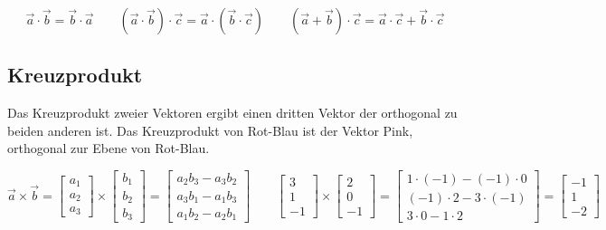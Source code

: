 \begin{equation*}
    \vec{a} \cdot \vec{b} = \vec{b} \cdot \vec{a}
    \qquad (\vec{a} \cdot \vec{b}) \cdot \vec{c} = \vec{a} \cdot (\vec{b} \cdot \vec{c})
    \qquad (\vec{a} + \vec{b}) \cdot \vec{c}  = \vec{a} \cdot \vec{c} + \vec{b} \cdot \vec{c} 
\end{equation*}

\subsection{Kreuzprodukt}

Das Kreuzprodukt zweier Vektoren ergibt einen dritten Vektor der orthogonal
zu beiden anderen ist. Das Kreuzprodukt von Rot-Blau ist der Vektor Pink, orthogonal zur
Ebene von Rot-Blau.

\begin{equation*}
    \vec{a} \times \vec{b} =
    \begin{bmatrix}
        a_1 \\
        a_2 \\
        a_3
    \end{bmatrix} \times
    \begin{bmatrix}
        b_1 \\
        b_2 \\
        b_3
    \end{bmatrix} =
    \begin{bmatrix}
        a_2 b_3 - a_3 b_2 \\
        a_3 b_1 - a_1 b_3 \\
        a_1 b_2 - a_2 b_1
    \end{bmatrix}
    \qquad
    \begin{bmatrix}
        3 \\
        1 \\
        -1
    \end{bmatrix} \times
    \begin{bmatrix}
        2 \\
        0 \\
        -1
    \end{bmatrix} =
    \begin{bmatrix}
        1 \cdot (-1) - (-1) \cdot 0 \\
        (-1) \cdot 2 - 3 \cdot (-1) \\
        3 \cdot 0 - 1 \cdot 2
    \end{bmatrix} =
    \begin{bmatrix}
        -1 \\
        1 \\
        -2
    \end{bmatrix}
\end{equation*}

